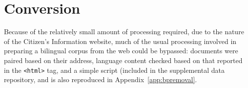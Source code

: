 \section{Conversion}

Because of the relatively small amount of processing required, due to the nature of the Citizen's 
Information website, much of the usual processing involved in preparing a bilingual corpus from the web
could be bypassed: documents were paired based on their address, language content checked based on that
reported in the \texttt{<html>} tag, and a simple script (included in the supplemental data repository, and
is also reproduced in Appendix~\ref{app:bpremoval}.